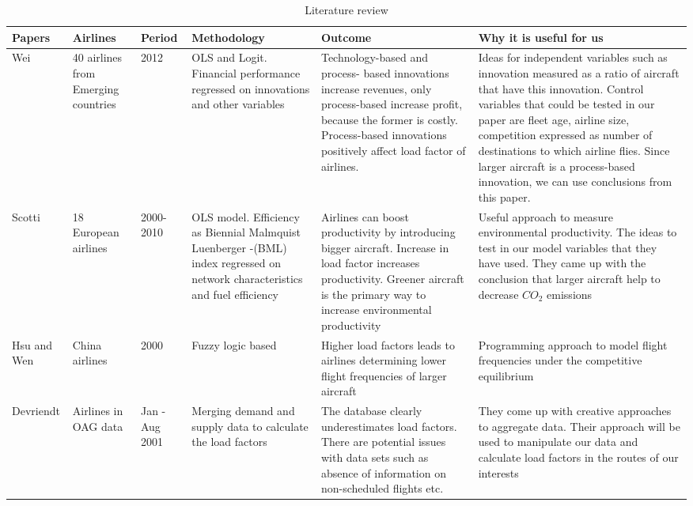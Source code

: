 \documentclass[titlepage, 11pt]{article}
\begin{document}
\begin{appendices}
\begin{footnotesize}
\begin{longtable}[h]{|  C{1 cm}  C{1cm}  C{1cm}   C{2cm} C{4cm}  C{5cm}|}
\caption[]{Literature review \label{litreview}}\\
\hline
\textbf{Papers} & \textbf{Airlines} & \textbf{Period} & \textbf{Methodology} & \textbf{Outcome} & \textbf{Why it is useful for us} \\[15mm]  \hline
Wei \cite{Emer1} & 40 airlines from Emerging countries & 2012 & OLS and Logit. Financial performance regressed on innovations and other variables & Technology-based and process- based innovations increase revenues, only process-based increase profit, because the former is costly. Process-based innovations positively affect load factor of airlines. & Ideas for independent variables such as innovation measured as a ratio of aircraft that have this innovation. Control variables that could be tested in our paper are fleet age, airline size, competition expressed as number of destinations to which airline flies. Since larger aircraft is a process-based innovation, we can use conclusions from this paper. \\[15mm] 
Scotti \cite{COEurope} & 18 European airlines & 2000-2010 & OLS model. Efficiency as Biennial Malmquist Luenberger -(BML) index regressed on network characteristics and fuel efficiency & Airlines can boost productivity by introducing bigger aircraft. Increase in load factor increases productivity. Greener aircraft is the primary way to increase environmental productivity & Useful approach to measure environmental productivity. The ideas to test in our model variables that they have used. They came up with the conclusion that larger aircraft help to decrease $CO_2$ emissions \\[15mm] \hline
Hsu and Wen \cite{Fuzzy} & China airlines & 2000 & Fuzzy logic based & Higher load factors leads to airlines determining lower flight frequencies of larger aircraft & Programming approach to model flight frequencies under the competitive equilibrium \\[15mm] 
Devriendt \cite{load} & Airlines in OAG data & Jan - Aug 2001 & Merging demand and supply data to calculate the load factors & The database clearly underestimates load factors. There are potential issues with data sets such as absence of information on non-scheduled flights etc. & They come up with creative approaches to aggregate data. Their approach will be used to manipulate our data and calculate load factors in the routes of our interests \\[15mm] 

\end{longtable}
\end{footnotesize}
\end{appendices}
\end{document}
